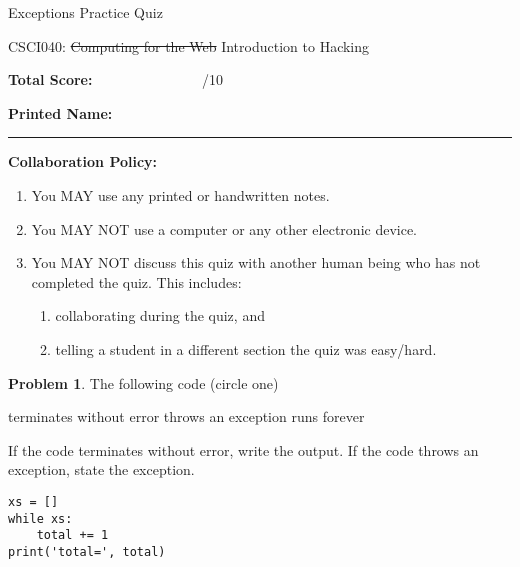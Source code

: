 \documentclass[10pt]{article}
\theoremstyle{definition}
\newtheorem{problem}{Problem}
\begin{document}
\begin{center}
    {
\Large
    Exceptions Practice Quiz
}

    \vspace{0.1in}
    CSCI040: \sout{Computing for the Web} Introduction to Hacking

    \vspace{0.1in}
\end{center}


\vspace{0.15in}
\noindent
\textbf{Total Score:} ~~~~~~~~~~~~~~~/10

\vspace{0.5in}
\noindent
\textbf{Printed Name:}

\noindent
\rule{\textwidth}{0.1pt}
\vspace{0.25in}

\noindent
\textbf{Collaboration Policy:}
\begin{enumerate}
    \item You MAY use any printed or handwritten notes.
    \item You MAY NOT use a computer or any other electronic device.
    \item You MAY NOT discuss this quiz with another human being who has not completed the quiz.
        This includes:
        \begin{enumerate}
            \item collaborating during the quiz, and
            \item telling a student in a different section the quiz was easy/hard.
        \end{enumerate}
\end{enumerate}

\vspace{0.15in}


\begin{problem}
    The following code (circle one)

    \vspace{0.25in}
    \hspace{0.5in}terminates without error 
    \hspace{1in}throws an exception
    \hspace{1in}runs forever
    \vspace{0.25in}

    \noindent
    If the code terminates without error, write the output.
    If the code throws an exception, state the exception.
\end{problem}
\begin{lstlisting}
xs = []
while xs:
    total += 1
print('total=', total)
\end{lstlisting}
\vspace{1in}
\end{document}
